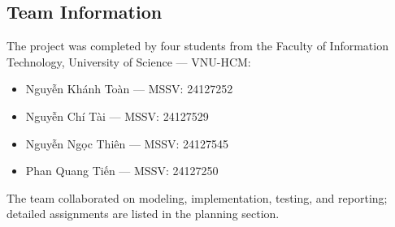 \documentclass[12pt, a4paper]{article}
\begin{document}
\subsection{Team Information}
The project was completed by four students from the Faculty of Information Technology, University of Science --- VNU-HCM:
\begin{itemize}
	\item Nguyễn Khánh Toàn --- MSSV: 24127252
	\item Nguyễn Chí Tài --- MSSV: 24127529
	\item Nguyễn Ngọc Thiên --- MSSV: 24127545
	\item Phan Quang Tiến --- MSSV: 24127250
\end{itemize}

The team collaborated on modeling, implementation, testing, and reporting; detailed assignments are listed in the planning section.













\end{document}
